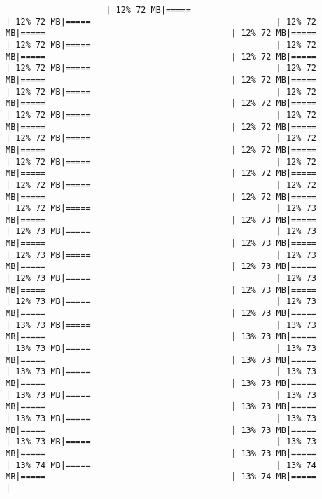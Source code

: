 \documentclass[
]{article}
\begin{document}
\begin{verbatim}
                    | 12% 72 MB|=====                                     | 12% 72 MB|=====                                     | 12% 72 MB|=====                                     | 12% 72 MB|=====                                     | 12% 72 MB|=====                                     | 12% 72 MB|=====                                     | 12% 72 MB|=====                                     | 12% 72 MB|=====                                     | 12% 72 MB|=====                                     | 12% 72 MB|=====                                     | 12% 72 MB|=====                                     | 12% 72 MB|=====                                     | 12% 72 MB|=====                                     | 12% 72 MB|=====                                     | 12% 72 MB|=====                                     | 12% 72 MB|=====                                     | 12% 72 MB|=====                                     | 12% 72 MB|=====                                     | 12% 72 MB|=====                                     | 12% 72 MB|=====                                     | 12% 72 MB|=====                                     | 12% 72 MB|=====                                     | 12% 72 MB|=====                                     | 12% 72 MB|=====                                     | 12% 72 MB|=====                                     | 12% 72 MB|=====                                     | 12% 73 MB|=====                                     | 12% 73 MB|=====                                     | 12% 73 MB|=====                                     | 12% 73 MB|=====                                     | 12% 73 MB|=====                                     | 12% 73 MB|=====                                     | 12% 73 MB|=====                                     | 12% 73 MB|=====                                     | 12% 73 MB|=====                                     | 12% 73 MB|=====                                     | 12% 73 MB|=====                                     | 12% 73 MB|=====                                     | 12% 73 MB|=====                                     | 12% 73 MB|=====                                     | 13% 73 MB|=====                                     | 13% 73 MB|=====                                     | 13% 73 MB|=====                                     | 13% 73 MB|=====                                     | 13% 73 MB|=====                                     | 13% 73 MB|=====                                     | 13% 73 MB|=====                                     | 13% 73 MB|=====                                     | 13% 73 MB|=====                                     | 13% 73 MB|=====                                     | 13% 73 MB|=====                                     | 13% 73 MB|=====                                     | 13% 73 MB|=====                                     | 13% 73 MB|=====                                     | 13% 73 MB|=====                                     | 13% 73 MB|=====                                     | 13% 73 MB|=====                                     | 13% 73 MB|=====                                     | 13% 74 MB|=====                                     | 13% 74 MB|=====                                     | 13% 74 MB|=====                                     | 
\end{verbatim}
\end{document}
